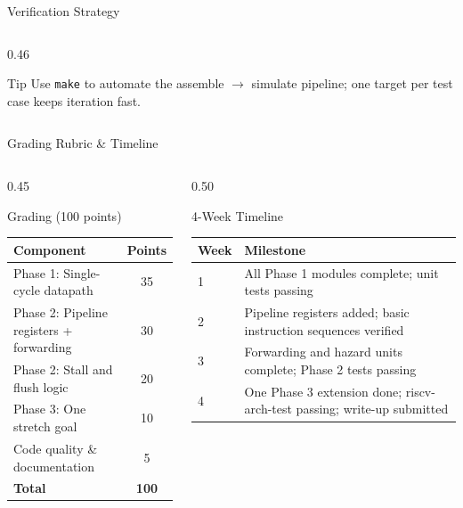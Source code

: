 \documentclass[aspectratio=169,10pt]{beamer}
\begin{document}
\begin{frame}{Verification Strategy}
\begin{columns}[T]
\begin{column}{0.46\textwidth}
      \begin{exampleblock}{Tip}
        \small
        Use \texttt{make} to automate the assemble $\to$ simulate pipeline; one target per test case keeps iteration fast.
      \end{exampleblock}
    \end{column}
  \end{columns}
\end{frame}

\begin{frame}{Grading Rubric \& Timeline}
  \begin{columns}[T]
    \begin{column}{0.45\textwidth}
      \begin{block}{Grading (100 points)}
        \renewcommand{\arraystretch}{1.2}
        \begin{tabular}{lc}
          \toprule
          Component & Points \\
          \midrule
          Phase 1: Single-cycle datapath & 35 \\
          Phase 2: Pipeline registers + forwarding & 30 \\
          Phase 2: Stall and flush logic & 20 \\
          Phase 3: One stretch goal & 10 \\
          Code quality \& documentation & 5 \\
          \midrule
          \textbf{Total} & \textbf{100} \\
          \bottomrule
        \end{tabular}
      \end{block}
    \end{column}
    \begin{column}{0.50\textwidth}
      \begin{block}{4-Week Timeline}
        \renewcommand{\arraystretch}{1.2}
        \begin{tabular}{lp{5.2cm}}
          \toprule
          Week & Milestone \\
          \midrule
          1 & All Phase 1 modules complete; unit tests passing \\
          2 & Pipeline registers added; basic instruction sequences verified \\
          3 & Forwarding and hazard units complete; Phase 2 tests passing \\
          4 & One Phase 3 extension done; riscv-arch-test passing; write-up submitted \\
          \bottomrule
        \end{tabular}
      \end{block}
    \end{column}
  \end{columns}
\end{frame}
\end{document}
